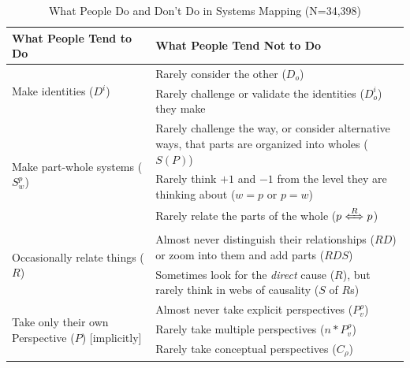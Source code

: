 \documentclass{tufte-handout}
\begin{document}
\begin{table}[ht]
\centering
\setlength{\tabcolsep}{6pt}
\renewcommand{\arraystretch}{1.5}
\begin{tabular}{p{1in}|p{2.8in}} 
\hline
\textbf{What People Tend to Do} & \textbf{What People Tend Not to Do} \\ \hline
\multirow{2}{1in}{Make identities ($D^i$)} & Rarely consider the other ($D_o$) \\ %
& Rarely challenge or validate the identities ($D_{o}^{i}$) they make \\ \hline

\multirow{3}{1in}{Make part-whole systems ($S_{w}^{p}$)} & Rarely challenge the way, or consider alternative ways, that parts are organized into wholes ($S(P)$) \\ %
& Rarely think $+1$ and $-1$ from the level they are thinking about ($w=p$ or $p=w$) \\ %
& Rarely relate the parts of the whole ($p \xLeftrightarrow[]{R}p$) \\ \hline
\multirow{2}{1in}{Occasionally relate things ($R$)} & Almost never distinguish their relationships ($RD$) or zoom into them and add parts ($RDS$)\\ %
 & Sometimes look for the \textit{direct} cause ($R$), but rarely think in webs of causality ($S$ of $R$s)\\ \hline
\multirow{3}{1in}{Take only their own Perspective ($P$) [implicitly]} & Almost never take explicit perspectives ($P_{v}^{\rho}$)  \\ %
&Rarely take multiple perspectives ($n*P_{v}^{\rho}$) \\ %
& Rarely take conceptual perspectives ($C_{\rho}$) \\ \hline
\end{tabular}
\vspace{3mm}
\caption{What People Do and Don't Do in Systems Mapping (N=34,398)}
\label{table:SMstudy}
\end{table}
\end{document}
